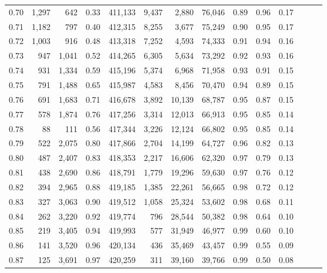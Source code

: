 \begin{tabular}{rrrrrrrrrrrrrr}
0.70 &   1,297 &    642 &  0.33 &  411,133 &    9,437 &   2,880 &  76,046 &  0.89 &  0.96 &      0.17 \\
0.71 &   1,182 &    797 &  0.40 &  412,315 &    8,255 &   3,677 &  75,249 &  0.90 &  0.95 &      0.17 \\
0.72 &   1,003 &    916 &  0.48 &  413,318 &    7,252 &   4,593 &  74,333 &  0.91 &  0.94 &      0.16 \\
0.73 &     947 &  1,041 &  0.52 &  414,265 &    6,305 &   5,634 &  73,292 &  0.92 &  0.93 &      0.16 \\
0.74 &     931 &  1,334 &  0.59 &  415,196 &    5,374 &   6,968 &  71,958 &  0.93 &  0.91 &      0.15 \\
0.75 &     791 &  1,488 &  0.65 &  415,987 &    4,583 &   8,456 &  70,470 &  0.94 &  0.89 &      0.15 \\
0.76 &     691 &  1,683 &  0.71 &  416,678 &    3,892 &  10,139 &  68,787 &  0.95 &  0.87 &      0.15 \\
0.77 &     578 &  1,874 &  0.76 &  417,256 &    3,314 &  12,013 &  66,913 &  0.95 &  0.85 &      0.14 \\
0.78 &      88 &    111 &  0.56 &  417,344 &    3,226 &  12,124 &  66,802 &  0.95 &  0.85 &      0.14 \\
0.79 &     522 &  2,075 &  0.80 &  417,866 &    2,704 &  14,199 &  64,727 &  0.96 &  0.82 &      0.13 \\
0.80 &     487 &  2,407 &  0.83 &  418,353 &    2,217 &  16,606 &  62,320 &  0.97 &  0.79 &      0.13 \\
0.81 &     438 &  2,690 &  0.86 &  418,791 &    1,779 &  19,296 &  59,630 &  0.97 &  0.76 &      0.12 \\
0.82 &     394 &  2,965 &  0.88 &  419,185 &    1,385 &  22,261 &  56,665 &  0.98 &  0.72 &      0.12 \\
0.83 &     327 &  3,063 &  0.90 &  419,512 &    1,058 &  25,324 &  53,602 &  0.98 &  0.68 &      0.11 \\
0.84 &     262 &  3,220 &  0.92 &  419,774 &      796 &  28,544 &  50,382 &  0.98 &  0.64 &      0.10 \\
0.85 &     219 &  3,405 &  0.94 &  419,993 &      577 &  31,949 &  46,977 &  0.99 &  0.60 &      0.10 \\
0.86 &     141 &  3,520 &  0.96 &  420,134 &      436 &  35,469 &  43,457 &  0.99 &  0.55 &      0.09 \\
0.87 &     125 &  3,691 &  0.97 &  420,259 &      311 &  39,160 &  39,766 &  0.99 &  0.50 &      0.08 \\

\end{tabular}
